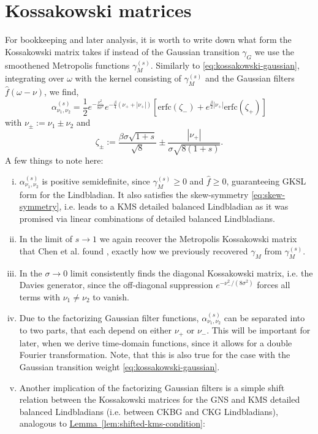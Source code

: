\smallskip
\label{sec:ckg-kossakowski}
\section{Kossakowski matrices}
For bookkeeping and later analysis, it is worth to write down what form the Kossakowski matrix takes if instead of the Gaussian transition $\gamma_G$ we use the smoothened Metropolis functions $\gamma_M^{(s)}$. Similarly to \eqref{eq:kossakowski-gaussian}, integrating over $\omega$ with the kernel consisting of $\gamma_M^{(s)}$ and the Gaussian filters $\hat{f}(\omega - \nu)$, we find, 
\begin{equation} \label{eq:kossakowski-smooth-metro}
    \alpha_{\nu_1, \nu_2}^{(s)} = \frac{1}{2}e^{-\frac{\nu_-^2}{8\sigma^2}}e^{-\frac{\beta}{4}(\nu_+ +|\nu_+|)}\left[\text{erfc}(\zeta_-) + e^{\frac{\beta}{2}|\nu_+|}\text{erfc}(\zeta_+)\right]
\end{equation}
with $\nu_\pm := \nu_1 \pm  \nu_2$ and 
$$
\zeta_\pm := \frac{\beta \sigma \sqrt{1 + s}}{\sqrt{8}} \pm \frac{|\nu_+|}{\sigma\sqrt{8(1 + s)}}.
$$
A few things to note here:
\begin{enumerate}[(i)]
    \item $\alpha^{(s)}_{\nu_1,\nu_2}$ is positive semidefinite, since $\gamma_M^{(s)}\geq 0$ and $\hat{f}\geq 0$, guaranteeing GKSL form for the Lindbladian. It also satisfies the skew-symmetry \eqref{eq:skew-symmetry}, i.e. leads to a KMS detailed balanced Lindbladian as it was promised via linear combinations of detailed balanced Lindbladians.
    \item In the limit of $s\rightarrow 1$ we again recover the Metropolis Kossakowski matrix that Chen et al. found \cite[Appendix B]{chen2023quantum}, exactly how we previously recovered $\gamma_M$ from $\gamma_M^{(s)}$.
    \item In the $\sigma\rightarrow 0$ limit consistently finds the diagonal Kossakowski matrix, i.e. the Davies generator, since the off-diagonal suppression $e^{-\nu_-^2 / (8\sigma^2)}$ forces all terms with $\nu_1 \neq \nu_2$ to vanish.
    \item Due to the factorizing Gaussian filter functions, $\alpha_{\nu_1,\nu_2}^{(s)}$ can be separated into to two parts, that each depend on either $\nu_+$ or $\nu_-$. This will be important for later, when we derive time-domain functions, since it allows for a double Fourier transformation. Note, that this is also true for the case with the Gaussian transition weight \eqref{eq:kossakowski-gaussian}.
    \item Another implication of the factorizing Gaussian filters is a simple shift relation between the Kossakowski matrices for the GNS and KMS detailed balanced Lindbladians (i.e. between CKBG and CKG Lindbladians), analogous to \hyperref[lem:shifted-kms-condition]{Lemma~\ref*{lem:shifted-kms-condition}}:
\end{enumerate}


